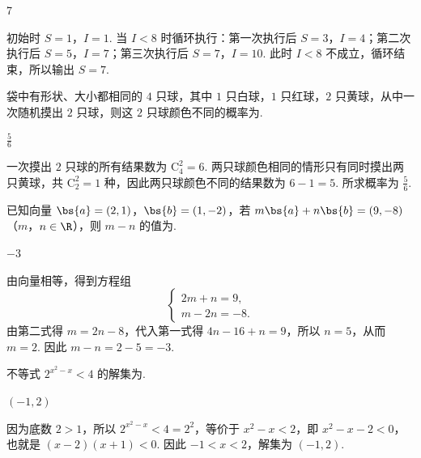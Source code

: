 \begin{answer}
7
\end{answer}

\begin{solution}
初始时 \(S=1\)，\(I=1\). 当 \(I<8\) 时循环执行：第一次执行后 \(S=3\)，\(I=4\)；第二次执行后 \(S=5\)，\(I=7\)；第三次执行后 \(S=7\)，\(I=10\). 此时 \(I<8\) 不成立，循环结束，所以输出 \(S=7\).
\end{solution}

\begin{problem}
袋中有形状、大小都相同的 \(4\) 只球，其中 \(1\) 只白球，\(1\) 只红球，\(2\) 只黄球，从中一次随机摸出 \(2\) 只球，则这 \(2\) 只球颜色不同的概率为\fillinblank{}.
\end{problem}

\begin{answer}
\(\frac{5}{6}\)
\end{answer}

\begin{solution}
一次摸出 \(2\) 只球的所有结果数为 \(\mathrm C_4^2=6\). 两只球颜色相同的情形只有同时摸出两只黄球，共 \(\mathrm C_2^2=1\) 种，因此两只球颜色不同的结果数为 \(6-1=5\). 所求概率为 \(\frac{5}{6}\).
\end{solution}

\begin{problem}
已知向量 \(\bs{a} = (2, 1)\)，\(\bs{b} = (1, -2)\)，若 \(m\bs{a} + n\bs{b} = (9, -8)\)（\(m\)，\(n \in \R\)），则 \(m - n\) 的值为\fillinblank{}.
\end{problem}

\begin{answer}
\(-3\)
\end{answer}

\begin{solution}
由向量相等，得到方程组
\[
\begin{cases}
2m+n=9,\\
m-2n=-8.
\end{cases}
\]
由第二式得 \(m=2n-8\)，代入第一式得 \(4n-16+n=9\)，所以 \(n=5\)，从而 \(m=2\). 因此 \(m-n=2-5=-3\).
\end{solution}

\begin{problem}
不等式 \(2^{x^2 - x} < 4\) 的解集为\fillinblank{}.
\end{problem}

\begin{answer}
\((-1,2)\)
\end{answer}

\begin{solution}
因为底数 \(2>1\)，所以 \(2^{x^{2}-x}<4=2^{2}\)，等价于 \(x^{2}-x<2\)，即 \(x^{2}-x-2<0\)，也就是 \((x-2)(x+1)<0\). 因此 \(-1<x<2\)，解集为 \((-1,2)\).
\end{solution}


